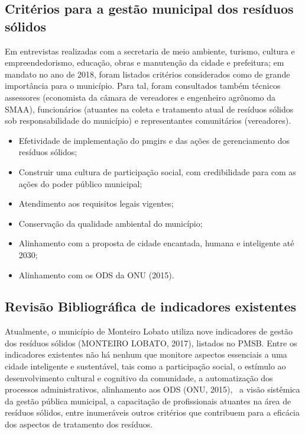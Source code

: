 	
	\subsection{Critérios para a gestão municipal dos resíduos sólidos}

	Em entrevistas realizadas com a secretaria de meio ambiente, turismo, cultura e empreendedorismo, educação, obras e manutenção da cidade e prefeitura; em mandato no ano de 2018, foram listados critérios considerados como de grande importância para o município. Para tal, foram consultados também técnicos assessores (economista da câmara de vereadores e engenheiro agrônomo da SMAA), funcionários (atuantes na coleta e tratamento atual de resíduos sólidos sob responsabilidade do município) e representantes comunitários (vereadores).
	
	\begin{itemize}
		\item Efetividade de implementação do \gls{pmgirs} e das ações de gerenciamento dos resíduos sólidos;
		\item Construir uma cultura de participação social, com credibilidade para com as ações do poder público municipal;
		\item Atendimento aos requisitos legais vigentes;
		\item Conservação da qualidade ambiental do município;
		\item Alinhamento com a proposta de cidade encantada, humana e inteligente até 2030;
		\item Alinhamento com os ODS da ONU (2015).
	\end{itemize}
	
	\subsection{Revisão Bibliográfica de indicadores existentes }
	
	Atualmente, o município de Monteiro Lobato utiliza nove indicadores de gestão dos resíduos sólidos (MONTEIRO LOBATO, 2017), listados no PMSB.
	Entre os indicadores existentes não há nenhum que monitore aspectos essenciais a uma cidade inteligente e sustentável, tais como a participação social, o estímulo ao desenvolvimento cultural e cognitivo da comunidade, a automatização dos processos administrativos, alinhamento aos ODS (ONU, 2015),  a visão sistêmica da gestão pública municipal, a capacitação de profissionais atuantes na área de resíduos sólidos, entre inumeráveis outros critérios que contribuem para a eficácia dos aspectos de tratamento dos resíduos.
	
